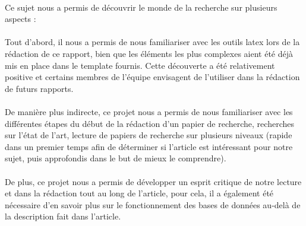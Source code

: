 \documentclass[a4paper, 12pt]{article}
\begin{document}
\paragraph{}
Ce sujet nous a permis de découvrir le monde de la recherche sur plusieurs aspects :

\paragraph{}
Tout d'abord, il nous a permis de nous familiariser avec les outils latex lors de la rédaction de ce rapport, bien que les éléments les plus complexes aient été déjà mis en place dans le template fournis. Cette découverte a été relativement positive et certains membres de l’équipe envisagent de l’utiliser dans la rédaction de futurs rapports.

\paragraph{}
De manière plus indirecte, ce projet nous a permis de nous familiariser avec les différentes étapes du début de la rédaction d’un papier de recherche, recherches sur l’état de l’art, lecture de papiers de recherche sur plusieurs niveaux (rapide dans un premier temps afin de déterminer si l’article est intéressant pour notre sujet, puis approfondis dans le but de mieux le comprendre).

\paragraph{}
De plus, ce projet nous a permis de développer un esprit critique de notre lecture et dans la rédaction tout au long de l’article, pour cela, il a également été nécessaire d’en savoir plus sur le fonctionnement des bases de données au-delà de la description fait dans l’article.


\clearpage 






\end{document}
